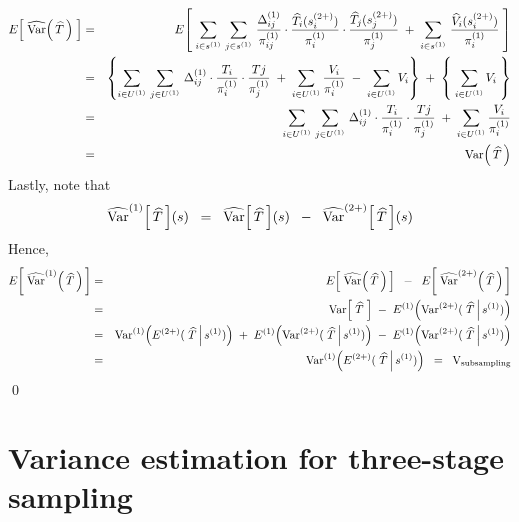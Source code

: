 \begin{eqnarray*}
E\!\left[\;\widehat{\textnormal{Var}}\!\left(\,\widehat{T}\,\right)\;\right]
&=&
E\!\left[\;
\sum_{i\in s^{(1)}}\,\sum_{j\in s^{(1)}}\,
\dfrac{\Delta^{(1)}_{ij}}{\pi^{(1)}_{ij}}
\cdot
\dfrac{\widehat{T}_{i}(s^{(2+)}_{i})}{\pi^{(1)}_{i}}
\cdot
\dfrac{\widehat{T}_{j}(s^{(2+)}_{j})}{\pi^{(1)}_{j}}
\;+\;
\sum_{i\in s^{(1)}}\,\dfrac{\widehat{V}_{i}(s^{(2+)}_{i})}{\pi^{(1)}_{i}}
\;\right]
\\
&=&
\left\{
\sum_{i \in U^{(1)}}\,\sum_{j \in U^{(1)}}\,
\Delta^{(1)}_{ij} \cdot \dfrac{T_{i}}{\pi^{(1)}_{i}} \cdot \dfrac{T{j}}{\pi^{(1)}_{j}}
\;+\;
\sum_{i \in U^{(1)}} \dfrac{V_{i}}{\pi^{(1)}_{i}}
\;-\;
\sum_{i \in U^{(1)}} V_{i}
\right\}
\;+\;
\left\{\;\sum_{i \in U^{(1)}} V_{i}\;\right\}
\\
&=&
\sum_{i \in U^{(1)}}\,\sum_{j \in U^{(1)}}\,
\Delta^{(1)}_{ij} \cdot \dfrac{T_{i}}{\pi^{(1)}_{i}} \cdot \dfrac{T{j}}{\pi^{(1)}_{j}}
\;+\;
\sum_{i \in U^{(1)}} \dfrac{V_{i}}{\pi^{(1)}_{i}}
\\
&=&
\textnormal{Var}\!\left(\,\widehat{T}\,\right)
\end{eqnarray*}
Lastly, note that
\begin{equation*}
\widehat{\textnormal{Var}}^{(1)}\!\left[\,\widehat{T}\,\right]\!(s)
\;\;=\;\;
\widehat{\textnormal{Var}}\!\left[\,\widehat{T}\,\right]\!(s)
\;\;-\;\;
\widehat{\textnormal{Var}}^{(2+)}\!\left[\,\widehat{T}\,\right]\!(s)
\end{equation*}
Hence,
\begin{eqnarray*}
E\!\left[\;
\widehat{\Var}^{(1)}\!\left(\,\widehat{T}\,\right)
\,\right]
&=&
E\!\left[\;\widehat{\Var}\!\left(\,\widehat{T}\,\right)\,\right]
\;\;-\;\;
E\!\left[\;\widehat{\Var}^{(2+)}\!\left(\,\widehat{T}\,\right)\,\right]
\\
&=&
\Var\!\left[\;\widehat{T}\;\right] \;-\; E^{(1)}\!\left(\Var^{(2+)}(\,\left.\widehat{T}\,\right\vert s^{(1)})\right)
\\
&=&
\Var^{(1)}\!\left(E^{(2+)}(\,\left.\widehat{T}\,\right\vert s^{(1)})\right)
\;+\;
E^{(1)}\!\left(\Var^{(2+)}(\,\left.\widehat{T}\,\right\vert s^{(1)})\right)
\;-\;
E^{(1)}\!\left(\Var^{(2+)}(\,\left.\widehat{T}\,\right\vert s^{(1)})\right)
\\
&=&
\Var^{(1)}\!\left(E^{(2+)}(\,\left.\widehat{T}\,\right\vert s^{(1)})\right)
\;\;=\;\;\textnormal{V}_{\textnormal{subsampling}}
\end{eqnarray*}
\qed


\clearpage
\section{Variance estimation for three-stage sampling}
\setcounter{theorem}{0}
\setcounter{equation}{0}

